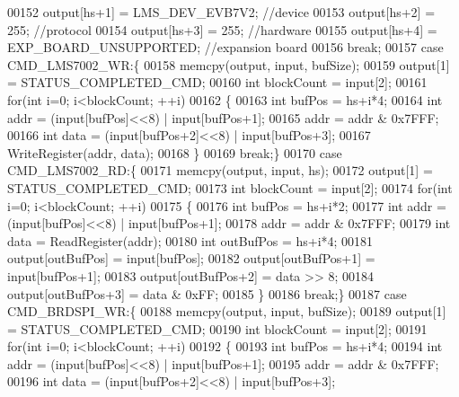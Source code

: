 \begin{DoxyCode}
{{{{{{{{{{00152         output[hs+1] = LMS_DEV_EVB7V2; \textcolor{comment}{//device}
00153         output[hs+2] = 255; \textcolor{comment}{//protocol}
00154         output[hs+3] = 255; \textcolor{comment}{//hardware}
00155         output[hs+4] = EXP_BOARD_UNSUPPORTED; \textcolor{comment}{//expansion board}
00156         \textcolor{keywordflow}{break};
00157     \textcolor{keywordflow}{case} CMD_LMS7002_WR:\{
00158         memcpy(output, input, bufSize);
00159         output[1] = STATUS_COMPLETED_CMD;
00160         \textcolor{keywordtype}{int} blockCount = input[2];
00161         \textcolor{keywordflow}{for}(\textcolor{keywordtype}{int} i=0; i<blockCount; ++i)
00162         \{
00163             \textcolor{keywordtype}{int} bufPos = hs+i*4;
00164             \textcolor{keywordtype}{int} addr = (input[bufPos]<<8) | input[bufPos+1];
00165             addr = addr & 0x7FFF;
00166             \textcolor{keywordtype}{int} data = (input[bufPos+2]<<8) | input[bufPos+3];
00167             WriteRegister(addr, data);
00168         \}
00169         \textcolor{keywordflow}{break};\}
00170     \textcolor{keywordflow}{case} CMD_LMS7002_RD:\{
00171         memcpy(output, input, hs);
00172         output[1] = STATUS_COMPLETED_CMD;
00173         \textcolor{keywordtype}{int} blockCount = input[2];
00174         \textcolor{keywordflow}{for}(\textcolor{keywordtype}{int} i=0; i<blockCount; ++i)
00175         \{
00176             \textcolor{keywordtype}{int} bufPos = hs+i*2;
00177             \textcolor{keywordtype}{int} addr = (input[bufPos]<<8) | input[bufPos+1];
00178             addr = addr & 0x7FFF;
00179             \textcolor{keywordtype}{int} data = ReadRegister(addr);
00180             \textcolor{keywordtype}{int} outBufPos = hs+i*4;
00181             output[outBufPos] = input[bufPos];
00182             output[outBufPos+1] = input[bufPos+1];
00183             output[outBufPos+2] = data >> 8;
00184             output[outBufPos+3] = data & 0xFF;
00185         \}
00186         \textcolor{keywordflow}{break};\}
00187     \textcolor{keywordflow}{case} CMD_BRDSPI_WR:\{
00188         memcpy(output, input, bufSize);
00189         output[1] = STATUS_COMPLETED_CMD;
00190         \textcolor{keywordtype}{int} blockCount = input[2];
00191         \textcolor{keywordflow}{for}(\textcolor{keywordtype}{int} i=0; i<blockCount; ++i)
00192         \{
00193             \textcolor{keywordtype}{int} bufPos = hs+i*4;
00194             \textcolor{keywordtype}{int} addr = (input[bufPos]<<8) | input[bufPos+1];
00195             addr = addr & 0x7FFF;
00196             \textcolor{keywordtype}{int} data = (input[bufPos+2]<<8) | input[bufPos+3];
}}}}}}}}}}
\end{DoxyCode}
